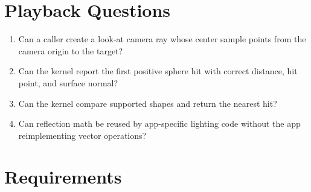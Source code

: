 \section{Playback Questions}\label{record-159-playback-questions}

\begin{enumerate}
\def\labelenumi{\arabic{enumi}.}
\tightlist
\item
  Can a caller create a look-at camera ray whose center sample points from the camera origin to the target?
\item
  Can the kernel report the first positive sphere hit with correct distance, hit point, and surface normal?
\item
  Can the kernel compare supported shapes and return the nearest hit?
\item
  Can reflection math be reused by app-specific lighting code without the app reimplementing vector operations?
\end{enumerate}

\section{Requirements}\label{record-159-requirements}

